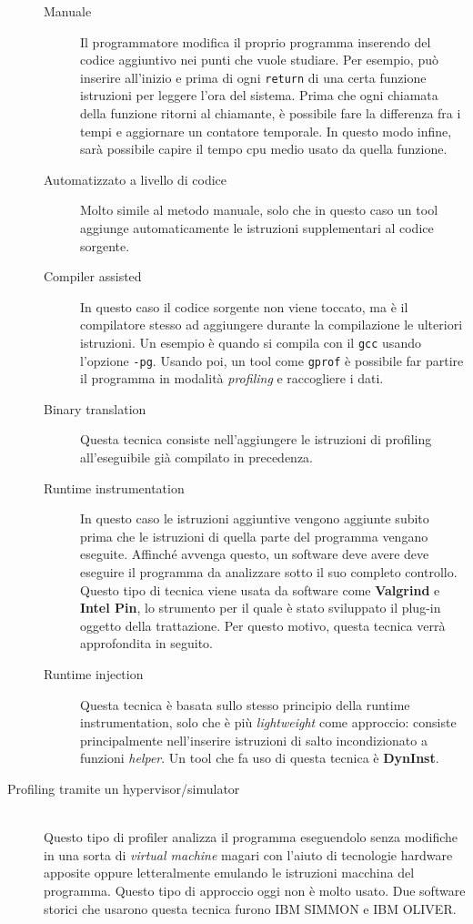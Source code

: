 \documentclass[a4paper,11pt]{report}
\begin{document}
\begin{description}
\begin{description}
\item[Manuale]
Il programmatore modifica il proprio programma inserendo del codice aggiuntivo nei punti che vuole studiare. Per esempio, può inserire all'inizio e prima di ogni \verb|return| di una certa funzione istruzioni per leggere l'ora del sistema. Prima che ogni chiamata della funzione ritorni al chiamante, è possibile fare la differenza fra i tempi e aggiornare un contatore temporale. In questo modo infine, sarà possibile capire il tempo cpu medio usato da quella funzione.
\item[Automatizzato a livello di codice]
Molto simile al metodo manuale, solo che in questo caso un tool aggiunge automaticamente le istruzioni supplementari al codice sorgente.
\item[Compiler assisted]
In questo caso il codice sorgente non viene toccato, ma è il compilatore stesso ad aggiungere durante la compilazione le ulteriori istruzioni. Un esempio è quando si compila con il \verb|gcc| usando l'opzione \verb|-pg|. Usando poi, un tool come \verb|gprof| è possibile far partire il programma in modalità \textit{profiling} e raccogliere i dati.
\item[Binary translation]
Questa tecnica consiste nell'aggiungere le istruzioni di profiling all'eseguibile già compilato in precedenza.
\item[Runtime instrumentation]
In questo caso le istruzioni aggiuntive vengono aggiunte subito prima che le istruzioni di quella parte del programma vengano eseguite. Affinché avvenga questo, un software deve avere deve eseguire il programma da analizzare sotto il suo completo controllo. Questo tipo di tecnica viene usata da software come \textbf{Valgrind} e \textbf{Intel Pin}, lo strumento per il quale è stato sviluppato il plug-in oggetto della trattazione. Per questo motivo, questa tecnica verrà approfondita in seguito.
\item[Runtime injection]
Questa tecnica è basata sullo stesso principio della runtime instrumentation, solo che è più \textit{lightweight} come approccio: consiste principalmente nell'inserire istruzioni di salto incondizionato a funzioni \textit{helper}. Un tool che fa uso di questa tecnica è \textbf{DynInst}.
\end{description} 
\item[Profiling tramite un hypervisor/simulator] \hfill \\
Questo tipo di profiler analizza il programma eseguendolo senza modifiche in una sorta di \textit{virtual machine} magari con l'aiuto di tecnologie hardware apposite oppure letteralmente emulando le istruzioni macchina del programma. Questo tipo di approccio oggi non è molto usato. Due software storici che usarono questa tecnica furono IBM SIMMON e IBM OLIVER. 
\end{description}
\end{document}
